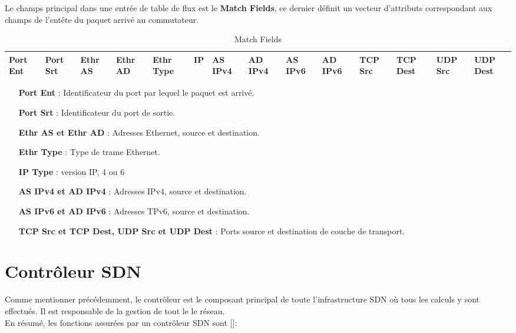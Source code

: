 Le champs principal dans une entrée de table de flux est le \textbf{Match Fields}, ce dernier définit un vecteur d'attributs correspondant aux champs de l’entête du paquet arrivé au commutateur.\\

\begin{table}[h]
\begin{center}
\begin{tabular}{ | m{0.7cm} | m{0.7cm} | m{0.7cm} | m{0.7cm} | m{0.7cm} | m{0.7cm} | m{0.7cm} | m{0.7cm} | m{0.7cm} | m{0.7cm} | m{0.7cm} | m{0.7cm} | m{0.7cm} | m{0.7cm} |}
\hline
\rowcolor[rgb]{0.80,0.80,0.80}
 Port Ent & Port Srt & Ethr AS & Ethr AD & Ethr Type & IP & AS IPv4 & AD IPv4 & AS IPv6 & AD IPv6 & TCP Src & TCP Dest & UDP Src & UDP Dest\\
\hline
\end{tabular}
\caption{Match Fields}
\end{center}
\end{table}

\begin{itemize}
\item[\textbf{Port Ent}]: Identificateur du port par lequel le paquet est arrivé.
\item[\textbf{Port Srt}]: Identificateur du port de sortie.
\item[\textbf{Ethr AS et Ethr AD}]: Adresses Ethernet, source et destination. 
\item[\textbf{Ethr Type}]: Type de trame Ethernet.
\item[\textbf{IP Type}]: version IP, 4 ou 6
\item[\textbf{AS IPv4 et AD IPv4}]: Adresses IPv4, source et destination.
\item[\textbf{AS IPv6 et AD IPv6}]: Adresses TPv6, source et destination.
\item[\textbf{TCP Src et TCP Dest, UDP Src et UDP Dest}]: Ports source et destination de couche de transport.
\end{itemize}

\newpage
\section{Contrôleur SDN}
Comme mentionner précédemment, le contrôleur est le composant principal de toute l'infrastructure SDN où tous les calculs y sont effectués. Il est responsable de la gestion de tout le le réseau.\\
En résumé, les fonctions assurées par un contrôleur SDN sont [\cite{6}]: \\

